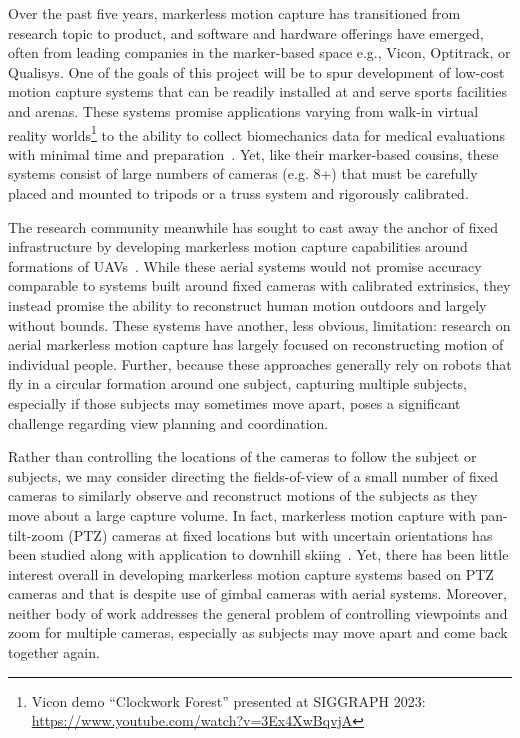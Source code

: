 \documentclass[12pt]{article}
\begin{document}
Over the past five years, markerless motion capture has transitioned from
research topic to product, and software and hardware offerings have emerged,
often from leading companies in the marker-based space e.g., Vicon, Optitrack,
or Qualisys.
One of the goals of this project will be to spur development of low-cost motion
capture systems that can be readily installed at and serve sports facilities and
arenas.
These systems promise applications varying from walk-in virtual reality
worlds\footnote{%
  Vicon demo ``Clockwork Forest'' presented at SIGGRAPH 2023:
  \url{https://www.youtube.com/watch?v=3Ex4XwBqvjA}
}
to the ability to collect biomechanics data for medical evaluations with minimal
time and preparation~\citep{wade2022peerj}.
Yet, like their marker-based cousins, these systems consist of large numbers of
cameras (e.g. 8+) that must be carefully placed and mounted to tripods or a
truss system and rigorously calibrated.

The research community meanwhile has sought to cast away the anchor of
fixed infrastructure by developing markerless motion capture capabilities around
formations of UAVs~\citep{saini2019iccv,ho2021iros,hong2024eccv,saini2022ral}.
While these aerial systems would not promise accuracy comparable to systems
built around fixed cameras with calibrated extrinsics, they instead promise the
ability to reconstruct human motion outdoors and largely without bounds.
These systems have another, less obvious, limitation: research on aerial
markerless motion capture has largely focused on reconstructing motion of
individual people.
Further, because these approaches generally rely on robots that fly in a
circular formation around one subject, capturing multiple subjects, especially
if those subjects may sometimes move apart, poses a significant challenge
regarding view planning and coordination.

Rather than controlling the locations of the cameras to follow the subject or
subjects, we may consider directing the fields-of-view of a small number of
fixed cameras to similarly observe and reconstruct motions of the subjects as
they move about a large capture volume.
In fact, markerless motion capture with pan-tilt-zoom (PTZ) cameras at fixed
locations but with uncertain orientations has been studied along with
application to downhill skiing~\citep{bachmann20193dv}.
Yet, there has been little interest overall in developing markerless motion
capture systems based on PTZ cameras and that is despite use of gimbal cameras
with aerial systems.
Moreover, neither body of work addresses the general problem of controlling
viewpoints and zoom for multiple cameras, especially as subjects may move apart
and come back together again.
\end{document}
